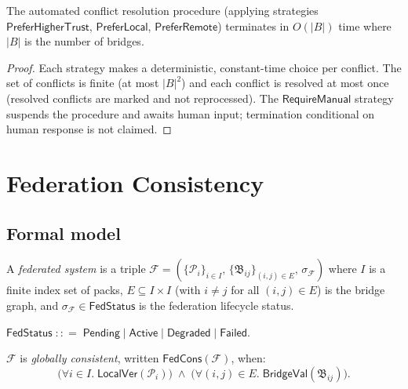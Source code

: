 \documentclass[11pt]{article}
\newcommand{\Pack}{\mathcal{P}}
\newcommand{\FedSys}{\mathcal{F}}
\newcommand{\Brid}{\mathfrak{B}}
\newcommand{\FedSt}{\sigma_{\!\mathcal{F}}}
\newcommand{\LocalVer}{\mathsf{LocalVer}}
\newcommand{\BridgeVal}{\ensuremath{\mathsf{BridgeVal}}}
\newcommand{\FedCons}{\ensuremath{\mathsf{FedCons}}}
\newcommand{\FedStat}{\mathsf{FedStatus}}
\begin{document}
\begin{proposition}
\label{prop:resolution-terminates}
The automated conflict resolution procedure (applying strategies
$\mathsf{PreferHigherTrust}$, $\mathsf{PreferLocal}$,
$\mathsf{PreferRemote}$) terminates in $O(|B|)$ time where $|B|$ is
the number of bridges.
\end{proposition}
\begin{proof}
Each strategy makes a deterministic, constant-time choice per
conflict.  The set of conflicts is finite (at most $|B|^2$) and each
conflict is resolved at most once (resolved conflicts are marked and
not reprocessed).  The $\mathsf{RequireManual}$ strategy suspends the
procedure and awaits human input; termination conditional on human
response is not claimed.
\end{proof}

\section{Federation Consistency}
\label{sec:federation}

\subsection{Formal model}

\begin{definition}
\label{def:fed-sys}
A \emph{federated system} is a triple
$\FedSys = (\{\Pack_i\}_{i \in I},\, \{\Brid_{ij}\}_{(i,j) \in E},\,
             \FedSt)$
where $I$ is a finite index set of packs, $E \subseteq I \times I$
(with $i \neq j$ for all $(i,j) \in E$) is the bridge graph, and
$\FedSt \in \FedStat$ is the federation lifecycle status.
\end{definition}

\begin{definition}[FederationStatus]
$\FedStat \;{:}{:}{=}\;
  \mathsf{Pending} \mid \mathsf{Active} \mid
  \mathsf{Degraded} \mid \mathsf{Failed}$.
\end{definition}

\begin{definition}
\label{def:global-cons}
$\FedSys$ is \emph{globally consistent}, written $\FedCons(\FedSys)$,
when:
\[
  \bigl(\forall i \in I.\; \LocalVer(\Pack_i)\bigr)
  \;\wedge\;
  \bigl(\forall (i,j) \in E.\; \BridgeVal(\Brid_{ij})\bigr).
\]
\end{definition}
\end{document}
